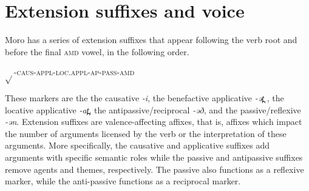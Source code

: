 %
%
%
%
%
%
%
%
%
%
%
%
%
%
%
%
%
%

\section{Extension suffixes and voice}\label{sec:ch11:extension}

Moro has a series of extension suffixes that appear following the verb root and before the final \textsc{amd} vowel, in the following order.

\ea
$\sqrt{}$-\textsc{caus-appl-loc.appl-ap-pass-amd}
 \z 

These markers are the the causative \textit{-i}, the benefactive applicative \textit{-ət̪ },  the locative applicative \textit{-at̪}, the antipassive/reciprocal \textit{-əð}, and the passive/reflexive \textit{-ən}. Extension suffixes are valence-affecting affixes, that is, affixes which impact the number of arguments licensed by the verb or the interpretation of these arguments. More specifically, the causative and applicative suffixes add arguments with specific semantic roles while the passive and antipassive suffixes remove agents and themes, respectively. The passive also functions as a reflexive marker, while the anti-passive functions as a reciprocal marker. 

